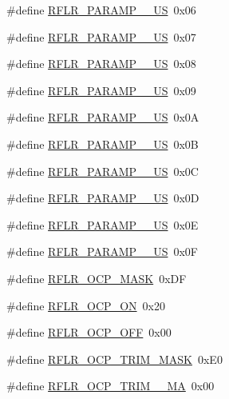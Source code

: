 \begin{DoxyCompactItemize}
\#define \hyperlink{sx1276Regs-LoRa_8h_a23f0326e72ee3f1041d32f7edbe30733}{R\+F\+L\+R\+\_\+\+P\+A\+R\+A\+M\+P\+\_\+\_\+\+US}~0x06
\item 
\#define \hyperlink{sx1276Regs-LoRa_8h_a274b21f651fded0ec4d35ed18dc281da}{R\+F\+L\+R\+\_\+\+P\+A\+R\+A\+M\+P\+\_\+\_\+\+US}~0x07
\item 
\#define \hyperlink{sx1276Regs-LoRa_8h_a00d7b1b7436424f43314df712aa89fe2}{R\+F\+L\+R\+\_\+\+P\+A\+R\+A\+M\+P\+\_\+\_\+\+US}~0x08
\item 
\#define \hyperlink{sx1276Regs-LoRa_8h_a9ce8032bc528b8f1a56e72a0fe6fb956}{R\+F\+L\+R\+\_\+\+P\+A\+R\+A\+M\+P\+\_\+\_\+\+US}~0x09
\item 
\#define \hyperlink{sx1276Regs-LoRa_8h_ae596e916faaf110c1306996dbd93d25f}{R\+F\+L\+R\+\_\+\+P\+A\+R\+A\+M\+P\+\_\+\_\+\+US}~0x0A
\item 
\#define \hyperlink{sx1276Regs-LoRa_8h_adb4da3360a1b4adf5de2c99f86d502c7}{R\+F\+L\+R\+\_\+\+P\+A\+R\+A\+M\+P\+\_\+\_\+\+US}~0x0B
\item 
\#define \hyperlink{sx1276Regs-LoRa_8h_afd5af86b9fcd58b5da08d807ab0deae5}{R\+F\+L\+R\+\_\+\+P\+A\+R\+A\+M\+P\+\_\+\_\+\+US}~0x0C
\item 
\#define \hyperlink{sx1276Regs-LoRa_8h_a58992d8a87351616671bb667124c136a}{R\+F\+L\+R\+\_\+\+P\+A\+R\+A\+M\+P\+\_\+\_\+\+US}~0x0D
\item 
\#define \hyperlink{sx1276Regs-LoRa_8h_a6af078a4ad16e7e83d180c4470e174e1}{R\+F\+L\+R\+\_\+\+P\+A\+R\+A\+M\+P\+\_\+\_\+\+US}~0x0E
\item 
\#define \hyperlink{sx1276Regs-LoRa_8h_a42510cd3823fa579f7ce0a2590414d94}{R\+F\+L\+R\+\_\+\+P\+A\+R\+A\+M\+P\+\_\+\_\+\+US}~0x0F
\item 
\#define \hyperlink{sx1276Regs-LoRa_8h_a811d1ea4838fb5bdbc731e246f9abd00}{R\+F\+L\+R\+\_\+\+O\+C\+P\+\_\+\+M\+A\+SK}~0x\+DF
\item 
\#define \hyperlink{sx1276Regs-LoRa_8h_ab4cd8bafefd94bf96c0eda92a1a0e2cc}{R\+F\+L\+R\+\_\+\+O\+C\+P\+\_\+\+ON}~0x20
\item 
\#define \hyperlink{sx1276Regs-LoRa_8h_add262ca41df12a73f7ab0fe05ca26253}{R\+F\+L\+R\+\_\+\+O\+C\+P\+\_\+\+O\+FF}~0x00
\item 
\#define \hyperlink{sx1276Regs-LoRa_8h_a218c5b62787ba2141067b6273f2e43a3}{R\+F\+L\+R\+\_\+\+O\+C\+P\+\_\+\+T\+R\+I\+M\+\_\+\+M\+A\+SK}~0x\+E0
\item 
\#define \hyperlink{sx1276Regs-LoRa_8h_a6656289f06f654d070ee51d72830d1cb}{R\+F\+L\+R\+\_\+\+O\+C\+P\+\_\+\+T\+R\+I\+M\+\_\+\_\+\+MA}~0x00

\end{DoxyCompactItemize}
